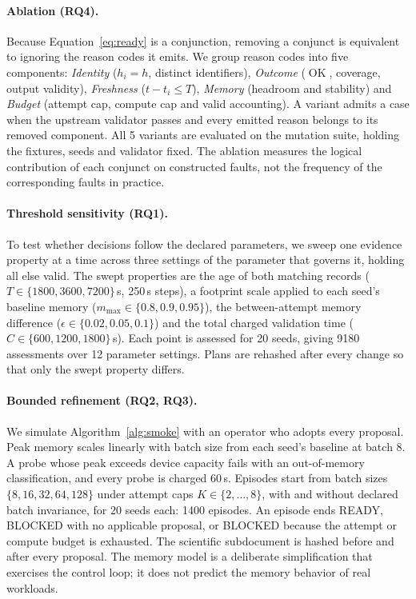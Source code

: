 \documentclass[pdflatex,sn-mathphys-num]{sn-jnl}
\theoremstyle{thmstylethree}
\newcommand{\LocalSeeds}{20}
\newcommand{\AblationVariants}{5}
\newcommand{\SensitivityAssessments}{9180}
\newcommand{\SensitivitySettings}{12}
\newcommand{\RefinementEpisodes}{1400}
\begin{document}
\begin{table}[t]

\end{table}

\paragraph{Ablation (RQ4).} Because Equation~\eqref{eq:ready} is a conjunction, removing a conjunct is equivalent to ignoring the reason codes it emits. We group reason codes into five components: \emph{Identity} ($h_i=h$, distinct identifiers), \emph{Outcome} ($\operatorname{OK}$, coverage, output validity), \emph{Freshness} ($t-t_i\leq T$), \emph{Memory} (headroom and stability) and \emph{Budget} (attempt cap, compute cap and valid accounting). A variant admits a case when the upstream validator passes and every emitted reason belongs to its removed component. All \AblationVariants{} variants are evaluated on the mutation suite, holding the fixtures, seeds and validator fixed. The ablation measures the logical contribution of each conjunct on constructed faults, not the frequency of the corresponding faults in practice.

\paragraph{Threshold sensitivity (RQ1).} To test whether decisions follow the declared parameters, we sweep one evidence property at a time across three settings of the parameter that governs it, holding all else valid. The swept properties are the age of both matching records ($T\in\{1800,3600,7200\}$\,s, 250\,s steps), a footprint scale applied to each seed's baseline memory ($m_{\max}\in\{0.8,0.9,0.95\}$), the between-attempt memory difference ($\epsilon\in\{0.02,0.05,0.1\}$) and the total charged validation time ($C\in\{600,1200,1800\}$\,s). Each point is assessed for \LocalSeeds{} seeds, giving \SensitivityAssessments{} assessments over \SensitivitySettings{} parameter settings. Plans are rehashed after every change so that only the swept property differs.

\paragraph{Bounded refinement (RQ2, RQ3).} We simulate Algorithm~\ref{alg:smoke} with an operator who adopts every proposal. Peak memory scales linearly with batch size from each seed's baseline at batch 8. A probe whose peak exceeds device capacity fails with an out-of-memory classification, and every probe is charged 60\,s. Episodes start from batch sizes $\{8,16,32,64,128\}$ under attempt caps $K\in\{2,\dots,8\}$, with and without declared batch invariance, for \LocalSeeds{} seeds each: \RefinementEpisodes{} episodes. An episode ends READY, BLOCKED with no applicable proposal, or BLOCKED because the attempt or compute budget is exhausted. The scientific subdocument is hashed before and after every proposal. The memory model is a deliberate simplification that exercises the control loop; it does not predict the memory behavior of real workloads.
\end{document}
